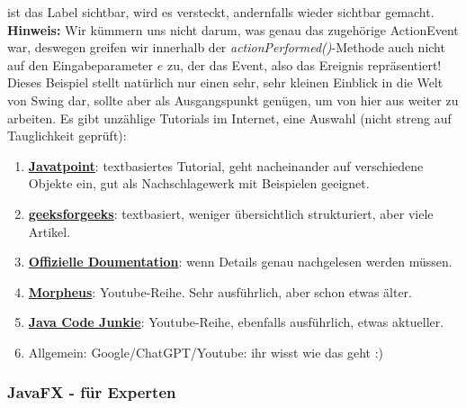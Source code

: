 \documentclass{article}
\begin{document}
ist das Label sichtbar, wird es versteckt, andernfalls wieder sichtbar gemacht. \\

\textbf{Hinweis:} Wir kümmern uns nicht darum, was genau das zugehörige ActionEvent war, deswegen greifen wir innerhalb der \textit{actionPerformed()}-Methode auch nicht auf den Eingabeparameter $e$ zu, der das Event, also das Ereignis repräsentiert! \\

Dieses Beispiel stellt natürlich nur einen sehr, sehr kleinen Einblick in die Welt von Swing dar, sollte aber als Ausgangspunkt genügen, um von hier aus weiter zu arbeiten. Es gibt unzählige Tutorials im Internet, eine Auswahl (nicht streng auf Tauglichkeit geprüft):
\begin{enumerate}
    \item \href{https://www.javatpoint.com/java-swing}{\textbf{Javatpoint}}: textbasiertes Tutorial, geht nacheinander auf verschiedene Objekte ein, gut als Nachschlagewerk mit Beispielen geeignet. 
    \item \href{https://www.geeksforgeeks.org/introduction-to-java-swing/}{\textbf{geeksforgeeks}}: textbasiert, weniger übersichtlich strukturiert, aber viele Artikel.
    \item  \href{https://docs.oracle.com/javase/7/docs/api/javax/swing/package-summary.html}{\textbf{Offizielle Doumentation}}: wenn Details genau nachgelesen werden müssen. 
    \item \href{https://www.youtube.com/playlist?list=PLNmsVeXQZj7o5ALam15-pQWtf22RgU6D7}{\textbf{Morpheus}}: Youtube-Reihe. Sehr ausführlich, aber schon etwas älter. 
    \item \href{https://www.youtube.com/playlist?list=PL3bGLnkkGnuV699lP_f9DvxyK5lMFpq6U}{\textbf{Java Code Junkie}}: Youtube-Reihe, ebenfalls ausführlich, etwas aktueller.
    \item Allgemein: Google/ChatGPT/Youtube: ihr wisst wie das geht :)
\end{enumerate}

\subsubsection{JavaFX - für Experten}
\end{document}
